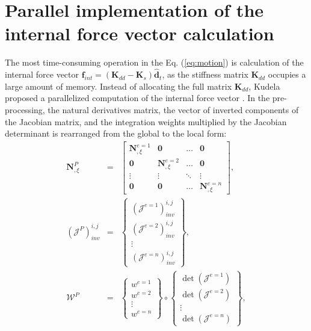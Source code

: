 \section{Parallel implementation of the internal force vector calculation}
\label{sec:gpu}


The most time-consuming operation in the Eq. (\ref{eq:motion}) is calculation of the internal force vector \(\textbf{f}_{int}=\left(\textbf{K}_{dd}-\textbf{K}_{s}\right)\widehat{\textbf{d}}_{t}\), as the stiffness matrix \(\textbf{K}_{dd}\) occupies a large amount of memory.
Instead of allocating the full matrix \(\textbf{K}_{dd}\), Kudela proposed a parallelized computation of the internal force vector \cite{kudela2016parallel}.
In the pre-processing, the natural derivatives matrix, the vector of inverted components of the Jacobian matrix, and the integration weights multiplied by the Jacobian determinant is rearranged from the global to the local form:
\begin{eqnarray}
	\label{eq:isoparametric}
	\textbf{N}^P_{,\xi} & = & \left[ \begin{array}{cccc}
		\textbf{N}^{e=1}_{,\xi} & \textbf{0} & \ldots & \textbf{0}\\
		\textbf{0} & \textbf{N}^{e=2}_{,\xi} & \ldots & \textbf{0}\\
		\vdots & \vdots &  \ddots & \vdots\\
		\textbf{0} & \textbf{0} & \ldots & \textbf{N}^{e=n}_{,\xi}
	\end{array}\right],\\
	\label{eq:jacob}
	\left(\mathcal{J}^P\right)^{i,j}_{inv} & = & \left\{ \begin{array}{c}
		\left(\mathcal{J}^{e=1}\right)^{i,j}_{inv}\\
		\left(\mathcal{J}^{e=2}\right)^{i,j}_{inv}\\
		\vdots\\
		\left(\mathcal{J}^{e=n}\right)^{i,j}_{inv} \end{array}\right\},\\
	\label{eq:intWeights}
	\mathcal{W}^P & = & \left\{ \begin{array}{c}
		w^{e=1}\\
		w^{e=2}\\
		\vdots\\
		w^{e=n} \end{array}\right\} \circ
	\left\{ \begin{array}{c}
		\det\left(\mathcal{J}^{e=1}\right)\\
		\det\left(\mathcal{J}^{e=2}\right)\\
		\vdots\\
		\det\left(\mathcal{J}^{e=n}\right)
	 \end{array}\right\},
\end{eqnarray}
